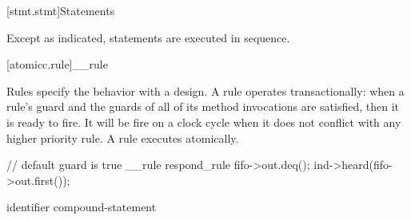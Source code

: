 [stmt.stmt]{Statements}%


\pnum
Except as indicated, statements are executed in sequence.

[atomicc.rule]{__rule}

Rules specify the behavior with a design. A rule operates
transactionally: when a rule's guard and the guards of all of its
method invocations are satisfied, then it is ready to fire. It will be
fire on a clock cycle when it does not conflict with any higher
priority rule. A rule executes atomically.

\begin{example}
\begin{codeblock}
     // default guard is true
     __rule respond_rule {
         fifo->out.deq();
         ind->heard(fifo->out.first());
     }
\end{codeblock}
\end{example}

\begin{bnf}
\br
     identifier  compound-statement\br

\end{bnf}
